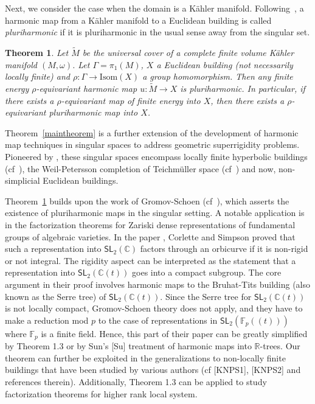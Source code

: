 \documentclass[12pt]{amsart}
\newtheorem{theorem}{Theorem}[section]
\theoremstyle{definition}
\numberwithin{equation}{section}
\newcommand{\R}{\mathbb R}
\newcommand{\C}{\mathbb C}
\begin{document}
Next, we consider the case when the domain is a K\"ahler manifold.  Following~\cite[Section 7]{gromov-schoen},  a harmonic map from a K\"ahler manifold to a Euclidean building is called {\it pluriharmonic} if it is pluriharmonic in the usual sense {away from the singular set. }


\begin{theorem}\label{maintheorem'} Let $\widetilde M$ be the universal cover of a complete finite volume K\"ahler manifold $(M, \omega)$. Let 
$\Gamma =\pi_1(M)$, $X$  a Euclidean building (not necessarily locally finite) and $\rho:\Gamma \rightarrow \text{Isom}(X)$ a group homomorphism. 
Then any finite energy  $\rho$-equivariant harmonic map $u: \widetilde M \rightarrow X$ is pluriharmonic.  {In particular, if there exists a  $\rho$-equivariant map of finite energy into $X$, then there exists a $\rho$-equivariant pluriharmonic map into $X$.}
\end{theorem}




Theorem~\ref{maintheorem} is a further extension of the development of harmonic map techniques in singular spaces  to address geometric superrigidity problems.
Pioneered by \cite{gromov-schoen}, these singular spaces encompass  locally finite hyperbolic buildings  (cf~\cite{daskal-meseGAFA}), the Weil-Petersson completion of Teichm\"uller space (cf~\cite{daskal-meseINV}) and now, non-simplicial Euclidean buildings.  

Theorem~\ref{maintheorem'} builds upon the work of  Gromov-Schoen (cf~\cite[Section 9]{gromov-schoen}), which asserts the existence of pluriharmonic maps in the singular setting.
A notable application is in the factorization theorems for  Zariski dense representations of  fundamental groups of algebraic varieties.
In the paper \cite{corlette-simpson}, Corlette and Simpson proved that such a representation into $\mathsf{SL}_2(\C)$ factors through an orbicurve if it is non-rigid or not integral.   The rigidity aspect can be interpreted as the statement that a representation   into $\mathsf{SL}_2(\C(t))$  goes into a compact subgroup. The core argument in their proof involves harmonic maps to the Bruhat-Tits building (also known as the Serre tree) of $\mathsf{SL}_2(\mathbb{C}(t))$.  Since the Serre tree for $\mathsf{SL}_2(\C(t))$ is not locally compact, Gromov-Schoen theory does not apply, and they have to  make  a reduction mod $p$ to the case of representations in $\mathsf{SL}_2(\mathbb{F}_p((t)))$ where $\mathbb{F}_p$ is a finite field.  Hence,  this part of their paper can be greatly simplified by Theorem 1.3 or by Sun’s [Su] treatment of harmonic maps into $\R$-trees.  Our theorem can further be exploited in the generalizations to non-locally finite buildings that have been studied by various authors (cf [KNPS1], [KNPS2] and references therein).  Additionally, Theorem 1.3 can be applied to study factorization theorems for higher rank local system.   
\end{document}
